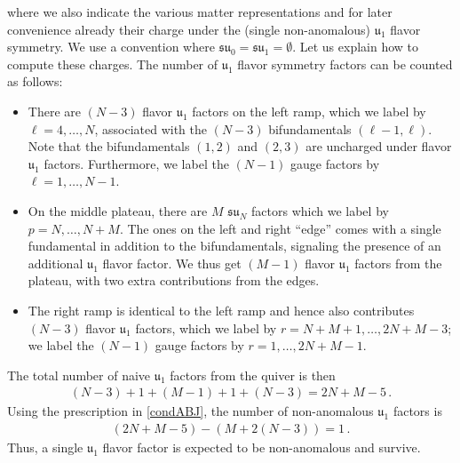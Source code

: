 \documentclass[11pt]{article}
\numberwithin{equation}{section}
\newcommand{\fu}{\mathfrak{u}}
\newcommand{\fsu}{\mathfrak{su}}
\begin{document}
where we also indicate the various matter representations and for later convenience already their charge under the (single non-anomalous) $\fu_1$ flavor symmetry. We use a convention where $\fsu_0=\fsu_1=\emptyset$. Let us explain how to compute these charges. The number of $\fu_1$ flavor symmetry factors can be counted as follows:
\begin{itemize}
\item There are $(N-3)$ flavor $\fu_1$ factors on the left ramp, which we label by $\ell=4,\ldots, N$, associated with the $(N-3)$ bifundamentals $(\ell-1,\ell)$. Note that the bifundamentals $(1,2)$ and $(2,3)$ are uncharged under flavor $\fu_1$ factors. Furthermore, we label the $(N-1)$ gauge factors by $\ell=1,\ldots, N-1$.
\item On the middle plateau, there are $M$ $\fsu_N$ factors which we label by $p=N,\ldots, N + M$. The ones on the left and right ``edge'' comes with a single fundamental in addition to the bifundamentals, signaling the presence of an additional $\mathfrak{u}_1$ flavor factor. We thus get $(M-1)$ flavor $\fu_1$ factors from the plateau, with two extra contributions from the edges.
\item The right ramp is identical to the left ramp and hence also contributes $(N-3)$ flavor $\fu_1$ factors, which we label by $r=N+M+1,\ldots, 2N+M-3$; we label the $(N-1)$ gauge factors by $r=1,\ldots, 2N+M-1$.
\end{itemize}
The total number of naive $\fu_1$ factors from the quiver is then
\begin{align}
(N-3) + 1 + (M-1) + 1 + (N-3)=2N+M-5\,.
\end{align}
Using the prescription in \eqref{condABJ}, the number of non-anomalous $\fu_1$ factors is 
\begin{align}
(2N+M-5)-(M+2(N-3))=1\,.
\end{align}
Thus, a single $\fu_1$ flavor factor is expected to be non-anomalous and survive. 
\end{document}

